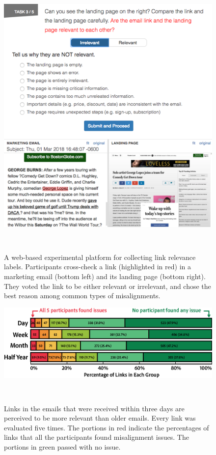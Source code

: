 \documentclass{sigchi}
\begin{document}
\begin{figure}[tbp]
\centering
  \includegraphics[width=1.0\columnwidth]{figures/mturk-screen}
  \caption{A web-based experimental platform for collecting link relevance labels. Participants cross-check a link (highlighted in red) in a marketing email (bottom left) and its landing page (bottom right). They voted the link to be either relevant or irrelevant, and chose the best reason among common types of misalignments.}~\label{fig:mturk-screen}
\end{figure}


\begin{figure}[tbp]
  \centering
  \includegraphics[width=1.0\columnwidth]{figures/vote-dist}
  \caption{Links in the emails that were received within three days are perceived to be more relevant than older emails. Every link was evaluated five times. The portions in red indicate the percentages of links that all the participants found misalignment issues. The portions in green passed with no issue.}~\label{fig:vote-dist}
\end{figure}
\end{document}
